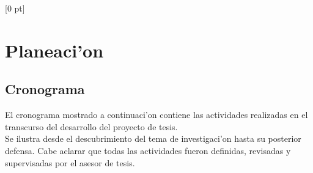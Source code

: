 \titlespacing{\chapter}{0 pt}{30 pt}{50 pt}[0 pt]
\titleformat{\section}{\Large\bfseries}{\thesection}{0 pt}{\hspace{30 pt}}
\titleformat{\subsection}{\large\bfseries}{\thesubsection}{0 pt}{\hspace{30 pt}}
\pagestyle{fancy}
\fancyhead[LO,LE]{\footnotesize\textit{\leftmark}}
\fancyhead[RO,RE]{\thepage}
\fancyfoot[CO,CE]{}

\chapter{Planeaci'on} %

\normalsize

\section{Cronograma}
\noindent
El cronograma mostrado a continuaci'on contiene las actividades realizadas en el transcurso del desarrollo del proyecto de tesis.\\

Se ilustra desde el descubrimiento del tema de investigaci'on hasta su posterior defensa. Cabe aclarar que todas las actividades fueron definidas, revisadas y supervisadas por el asesor de tesis.

